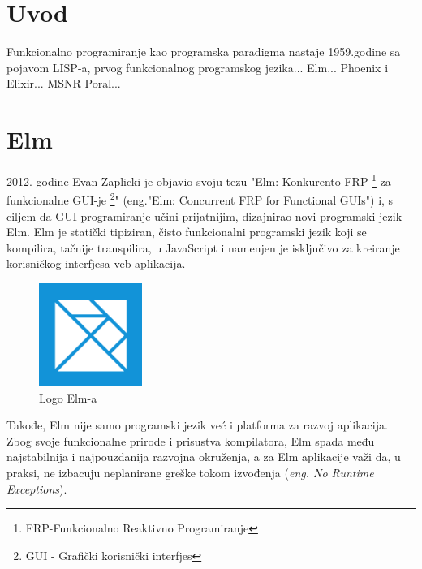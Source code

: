 \documentclass[12pt,oneside]{memoir}
\begin{document}
\frontmatter
\naslovna
\komisija
\apstrakt
\tableofcontents*

\mainmatter

\chapter{Uvod}

Funkcionalno programiranje kao programska paradigma nastaje 1959.godine sa
pojavom LISP-a, prvog funkcionalnog programskog jezika...
 Elm... Phoenix i Elixir... MSNR Poral...

\chapter{Elm}
2012. godine Evan Zaplicki je objavio svoju tezu "Elm: Konkurento FRP 
\footnote{FRP-Funkcionalno Reaktivno Programiranje} za funkcionalne GUI-je 
\footnote{GUI - Grafički korisnički interfjes }" (eng."Elm: Concurrent FRP
for Functional GUIs") \cite{elm:2012} i, s ciljem da GUI programiranje učini
prijatnijim, dizajnirao novi programski jezik - Elm.
Elm je statički tipiziran, čisto funkcionalni programski jezik koji se
kompilira, tačnije transpilira, u JavaScript i namenjen je isključivo za
kreiranje korisničkog interfjesa veb aplikacija.
\begin{figure}[!ht]
  \centering
  \includegraphics[width=0.3\textwidth]{elm.png}
  \caption{Logo Elm-a}
\end{figure}
Takođe, Elm nije samo programski jezik već i platforma za razvoj aplikacija.
Zbog svoje funkcionalne prirode i prisustva kompilatora, Elm spada među
najstabilnija i najpouzdanija razvojna okruženja, a za Elm aplikacije važi
da, u praksi, ne izbacuju neplanirane greške tokom izvođenja (\emph{eng. No 
Runtime Exceptions}).
\end{document}
